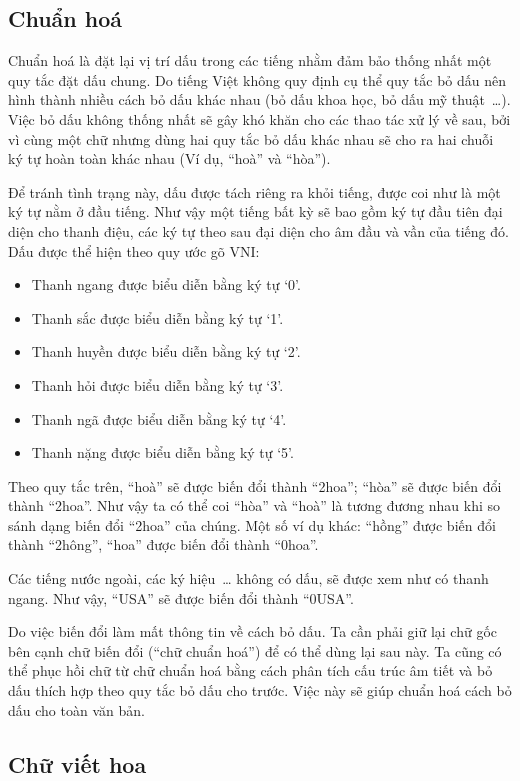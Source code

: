 \documentclass[a4paper,oneside,14pt]{extbook} %
\begin{document}
\subsection{Chuẩn hoá}

Chuẩn hoá là đặt lại vị trí dấu trong các tiếng nhằm đảm bảo thống
nhất một quy tắc đặt dấu chung. Do tiếng Việt không quy định cụ thể
quy tắc bỏ dấu nên hình thành nhiều cách bỏ dấu khác nhau (bỏ dấu khoa
học, bỏ dấu mỹ thuật~\ldots). Việc bỏ dấu không thống nhất sẽ gây khó
khăn cho các thao tác xử lý về sau, bởi vì cùng một chữ nhưng dùng hai
quy tắc bỏ dấu khác nhau sẽ cho ra hai chuỗi ký tự hoàn toàn khác nhau
(Ví dụ, ``hoà'' và ``hòa''). 

Để tránh tình trạng này, dấu được tách
riêng ra khỏi tiếng, được coi như là một ký tự nằm ở đầu tiếng. Như
vậy một tiếng bất kỳ sẽ bao gồm ký tự đầu tiên đại diện cho thanh
điệu, các ký tự theo sau đại diện cho âm đầu và vần của tiếng đó. Dấu
được thể hiện theo quy ước gõ VNI:
\begin{itemize}
\item Thanh ngang được biểu diễn bằng ký tự `0'.
\item Thanh sắc được biểu diễn bằng ký tự `1'.
\item Thanh huyền được biểu diễn bằng ký tự `2'.
\item Thanh hỏi được biểu diễn bằng ký tự `3'.
\item Thanh ngã được biểu diễn bằng ký tự `4'.
\item Thanh nặng được biểu diễn bằng ký tự `5'.
\end{itemize}

Theo quy tắc trên, ``hoà'' sẽ được biến đổi thành ``2hoa'';
``hòa'' sẽ được biến đổi thành ``2hoa''. Như vậy ta có thể coi ``hòa''
và ``hoà'' là tương đương nhau khi so sánh dạng biến đổi ``2hoa'' của
chúng. Một số ví dụ khác: ``hồng'' được biến đổi thành ``2hông'',
``hoa'' được biến đổi thành ``0hoa''.

Các tiếng nước ngoài, các ký hiệu~\ldots{} không có dấu, sẽ được xem như
có thanh ngang. Như vậy, ``USA'' sẽ được biến đổi thành ``0USA''.

Do việc biến đổi làm mất thông tin về cách bỏ dấu. Ta cần phải giữ lại
chữ gốc bên cạnh chữ biến đổi (``chữ chuẩn hoá'') để có thể dùng lại
sau này. Ta cũng có thể phục hồi chữ từ chữ chuẩn hoá bằng cách phân
tích cấu trúc âm tiết và bỏ dấu thích hợp theo quy tắc bỏ dấu cho
trước. Việc này sẽ giúp chuẩn hoá cách bỏ dấu cho toàn văn bản.

\subsection{Chữ viết hoa}
\end{document}
